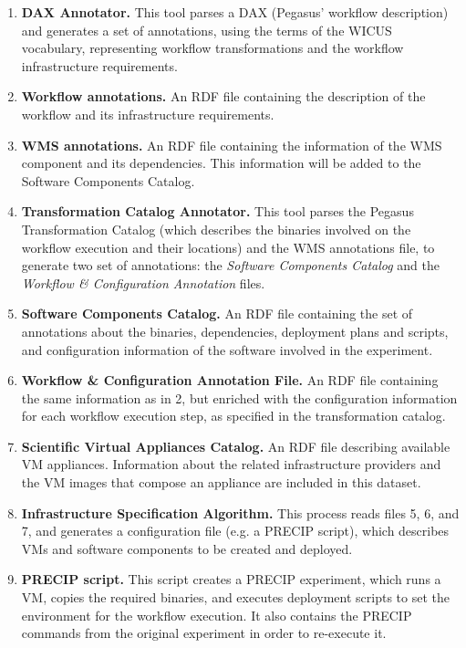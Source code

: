\begin{enumerate}
	\item \textbf{DAX Annotator.} This tool parses a DAX (Pegasus' workflow description) and generates a set of annotations, using the terms of the WICUS vocabulary, representing workflow transformations and the workflow infrastructure requirements.

	\item \textbf{Workflow annotations.} An RDF file containing the description of the workflow and its infrastructure requirements.

	\item \textbf{WMS annotations.} An RDF file containing the information of the WMS component and its dependencies. This information will be added to the Software Components Catalog.

	\item \textbf{Transformation Catalog Annotator.} This tool parses the Pegasus Transformation Catalog (which describes the binaries involved on the workflow execution and their locations) and the WMS annotations file, to generate two set of annotations: the \emph{Software Components Catalog} and the \emph{Workflow \& Configuration Annotation} files.

	\item \textbf{Software Components Catalog.} An RDF file containing the set of annotations about the binaries, dependencies, deployment plans and scripts, and configuration information of the software involved in the experiment.

	\item \textbf{Workflow \& Configuration Annotation File.} An RDF file containing the same information as in 2, but enriched with the configuration information for each workflow execution step, as specified in the transformation catalog.

	\item \textbf{Scientific Virtual Appliances Catalog.} An RDF file describing available VM appliances. Information about the related infrastructure providers and the VM images that compose an appliance are included in this dataset.

	\item \textbf{Infrastructure Specification Algorithm.} This process reads files 5, 6, and 7, and generates a configuration file (e.g. a PRECIP script), which describes VMs and software components to be created and deployed.

	\item \textbf{PRECIP script.} This script creates a PRECIP experiment, which runs a VM, copies the required binaries, and executes deployment scripts to set the environment for the workflow execution. It also contains the PRECIP commands from the original experiment in order to re-execute it.

\end{enumerate}


